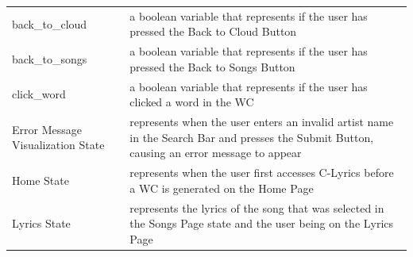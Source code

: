 \documentclass[]{article}
\begin{document}
\begin{longtable}[c]{@{}ll@{}}
\begin{minipage}[t]{0.47\columnwidth}
back\_to\_cloud
\end{minipage} & \begin{minipage}[t]{0.47\columnwidth}\raggedright
a boolean variable that represents if the user has pressed the Back to Cloud Button
\end{minipage}
\\\addlinespace
\begin{minipage}[t]{0.47\columnwidth}\raggedright
back\_to\_songs
\end{minipage} & \begin{minipage}[t]{0.47\columnwidth}\raggedright
a boolean variable that represents if the user has pressed the Back to Songs Button
\end{minipage}
\\\addlinespace
\begin{minipage}[t]{0.47\columnwidth}\raggedright
click\_word
\end{minipage} & \begin{minipage}[t]{0.47\columnwidth}\raggedright
a boolean variable that represents if the user has clicked a word in the WC
\end{minipage}
\\\addlinespace
\begin{minipage}[t]{0.47\columnwidth}\raggedright
Error Message Visualization State
\end{minipage} & \begin{minipage}[t]{0.47\columnwidth}\raggedright
represents when the user enters an invalid artist name in the Search Bar and presses the Submit Button, causing an error message to appear
\end{minipage}
\\\addlinespace
\begin{minipage}[t]{0.47\columnwidth}\raggedright
Home State
\end{minipage} & \begin{minipage}[t]{0.47\columnwidth}\raggedright
represents when the user first accesses C-Lyrics before a WC is generated on the Home Page
\end{minipage}
\\\addlinespace
\begin{minipage}[t]{0.47\columnwidth}\raggedright
Lyrics State
\end{minipage} & \begin{minipage}[t]{0.47\columnwidth}\raggedright
represents the lyrics of the song that was selected in the Songs Page state and the user being on the Lyrics Page
\end{minipage}

\end{longtable}
\end{document}
